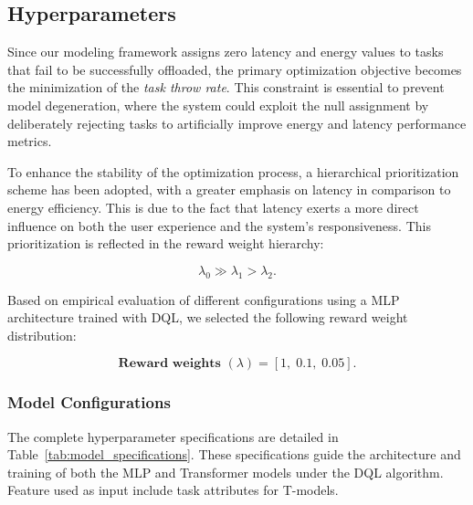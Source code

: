 \documentclass[preprint,3p,authoryear]{elsarticle}
\begin{document}
\subsection{Hyperparameters}\label{subsec:hyperparameters}


Since our modeling framework assigns zero latency and energy values to tasks that fail to be successfully offloaded, the primary optimization objective becomes the minimization of the \emph{task throw rate}. This constraint is essential to prevent model degeneration, where the system could exploit the null assignment by deliberately rejecting tasks to artificially improve energy and latency performance metrics.

To enhance the stability of the optimization process, a hierarchical prioritization scheme has been adopted, with a greater emphasis on latency in comparison to energy efficiency. This is due to the fact that latency exerts a more direct influence on both the user experience and the system's responsiveness. This prioritization is reflected in the reward weight hierarchy:

\[
\lambda_0 \gg \lambda_1 > \lambda_2.
\]

Based on empirical evaluation of different configurations using a MLP architecture trained with DQL, we selected the following reward weight distribution:

\[
\textbf{Reward weights } (\lambda) = [1,\; 0.1,\; 0.05].
\]


\subsubsection{Model Configurations}

The complete hyperparameter specifications are detailed in Table~\ref{tab:model_specifications}. These specifications guide the architecture and training of both the MLP and Transformer models under the DQL algorithm. Feature used as input include task attributes for T-models.


\begin{table}[H]
\centering

\caption{Model Specifications}\label{tab:model_specifications}
\end{table}
\end{document}
